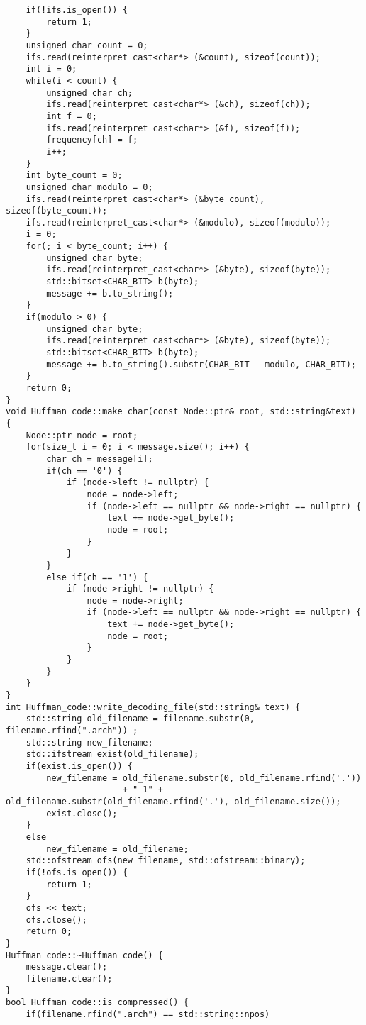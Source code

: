\begin{verbatim}
    if(!ifs.is_open()) {
        return 1;
    }
    unsigned char count = 0;
    ifs.read(reinterpret_cast<char*> (&count), sizeof(count));
    int i = 0;
    while(i < count) {
        unsigned char ch;
        ifs.read(reinterpret_cast<char*> (&ch), sizeof(ch));
        int f = 0;
        ifs.read(reinterpret_cast<char*> (&f), sizeof(f));
        frequency[ch] = f;
        i++;
    }
    int byte_count = 0;
    unsigned char modulo = 0;
    ifs.read(reinterpret_cast<char*> (&byte_count), sizeof(byte_count));
    ifs.read(reinterpret_cast<char*> (&modulo), sizeof(modulo));
    i = 0;
    for(; i < byte_count; i++) {
        unsigned char byte;
        ifs.read(reinterpret_cast<char*> (&byte), sizeof(byte));
        std::bitset<CHAR_BIT> b(byte);
        message += b.to_string();
    }
    if(modulo > 0) {
        unsigned char byte;
        ifs.read(reinterpret_cast<char*> (&byte), sizeof(byte));
        std::bitset<CHAR_BIT> b(byte);
        message += b.to_string().substr(CHAR_BIT - modulo, CHAR_BIT);
    }
    return 0;
}
void Huffman_code::make_char(const Node::ptr& root, std::string&text) {
    Node::ptr node = root;
    for(size_t i = 0; i < message.size(); i++) {
        char ch = message[i];
        if(ch == '0') {
            if (node->left != nullptr) {
                node = node->left;
                if (node->left == nullptr && node->right == nullptr) {
                    text += node->get_byte();
                    node = root;
                }
            }
        }
        else if(ch == '1') {
            if (node->right != nullptr) {
                node = node->right;
                if (node->left == nullptr && node->right == nullptr) {
                    text += node->get_byte();
                    node = root;
                }
            }
        }
    }
}
int Huffman_code::write_decoding_file(std::string& text) {
    std::string old_filename = filename.substr(0, filename.rfind(".arch")) ;
    std::string new_filename;
    std::ifstream exist(old_filename);
    if(exist.is_open()) {
        new_filename = old_filename.substr(0, old_filename.rfind('.'))
                       + "_1" + old_filename.substr(old_filename.rfind('.'), old_filename.size());
        exist.close();
    }
    else
        new_filename = old_filename;
    std::ofstream ofs(new_filename, std::ofstream::binary);
    if(!ofs.is_open()) {
        return 1;
    }
    ofs << text;
    ofs.close();
    return 0;
}
Huffman_code::~Huffman_code() {
    message.clear();
    filename.clear();
}
bool Huffman_code::is_compressed() {
    if(filename.rfind(".arch") == std::string::npos)

\end{verbatim}
